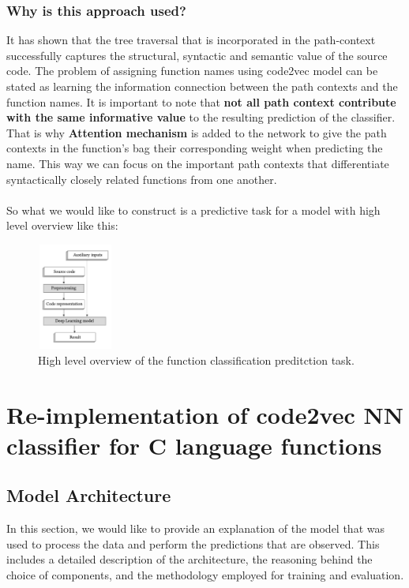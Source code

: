 \documentclass[10pt,english,a4paper]{report}
\begin{document}
\subsection{Why is this approach used?}
It has shown that the tree traversal that is incorporated in the path-context successfully captures the structural, syntactic and semantic value of the source code\cite{alon}. The problem of assigning function names using code2vec model
can be stated as learning the information connection between the path contexts and the function names. It is important to note that \textbf{not all path context contribute with the same informative value} to the resulting prediction of the classifier. That is why \textbf{Attention mechanism} \cite{attention} is added to the network to give the path contexts in the function's bag their corresponding weight when predicting the name. This way we can focus on the important path contexts that differentiate syntactically closely related functions from one another.
\\ \\
So what we would like to construct is a predictive task for a model with high level overview like this: 

\begin{figure}[H]
    \centering
    \includegraphics[width=2.5cm, height=3.5cm]{figures/high_level_prediciton_task.png}
    \caption{\cite{compiler_based} High level overview of the function classification preditction task.}
    \label{fig:predictive_task}
\end{figure}

\chapter{Re-implementation of code2vec NN classifier for C language functions}

\section{Model Architecture}
In this section, we would like to provide an explanation of the model that was used to process the data and perform the predictions that are observed. This includes a detailed description of the architecture, the reasoning behind the choice of components, and the methodology employed for training and evaluation.
\end{document}
